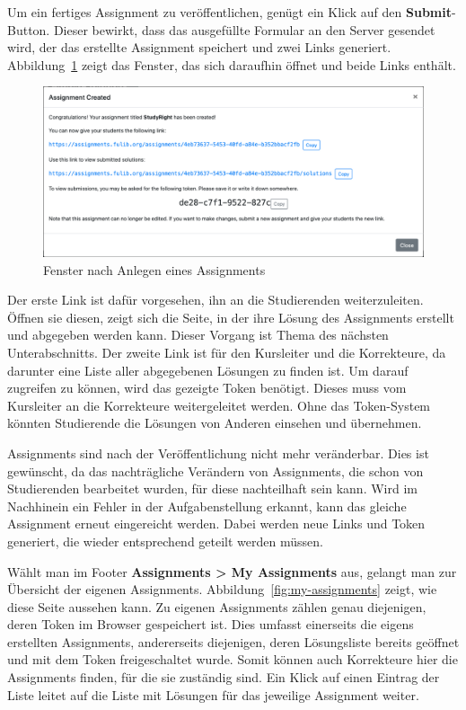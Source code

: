 Um ein fertiges Assignment zu veröffentlichen, genügt ein Klick auf den \textbf{Submit}-Button.
Dieser bewirkt, dass das ausgefüllte Formular an den Server gesendet wird, der das erstellte Assignment speichert und zwei Links generiert.
Abbildung~\ref{fig:create-assignment-success} zeigt das Fenster, das sich daraufhin öffnet und beide Links enthält.

\begin{figure}
    \centering
    \includegraphics[width=\textwidth]{chapter/fulib.org/img/create-assignment-success.png}
    \caption{Fenster nach Anlegen eines Assignments}
    \label{fig:create-assignment-success}
\end{figure}

Der erste Link ist dafür vorgesehen, ihn an die Studierenden weiterzuleiten.
Öffnen sie diesen, zeigt sich die Seite, in der ihre Lösung des Assignments erstellt und abgegeben werden kann.
Dieser Vorgang ist Thema des nächsten Unterabschnitts.
Der zweite Link ist für den Kursleiter und die Korrekteure, da darunter eine Liste aller abgegebenen Lösungen zu finden ist.
Um darauf zugreifen zu können, wird das gezeigte Token benötigt.
Dieses muss vom Kursleiter an die Korrekteure weitergeleitet werden.
Ohne das Token-System könnten Studierende die Lösungen von Anderen einsehen und übernehmen.

Assignments sind nach der Veröffentlichung nicht mehr veränderbar.
Dies ist gewünscht, da das nachträgliche Verändern von Assignments, die schon von Studierenden bearbeitet wurden, für diese nachteilhaft sein kann.
Wird im Nachhinein ein Fehler in der Aufgabenstellung erkannt, kann das gleiche Assignment erneut eingereicht werden.
Dabei werden neue Links und Token generiert, die wieder entsprechend geteilt werden müssen.

Wählt man im Footer \textbf{Assignments > My Assignments} aus, gelangt man zur Übersicht der eigenen Assignments.
Abbildung~\ref{fig:my-assignments} zeigt, wie diese Seite aussehen kann.
Zu eigenen Assignments zählen genau diejenigen, deren Token im Browser gespeichert ist.
Dies umfasst einerseits die eigens erstellten Assignments, andererseits diejenigen, deren Lösungsliste bereits geöffnet und mit dem Token freigeschaltet wurde.
Somit können auch Korrekteure hier die Assignments finden, für die sie zuständig sind.
Ein Klick auf einen Eintrag der Liste leitet auf die Liste mit Lösungen für das jeweilige Assignment weiter.

